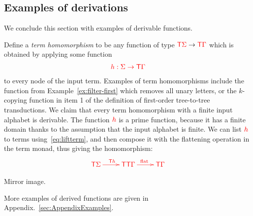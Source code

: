 

\subsection{Examples of derivations} 
\label{sec:example-derivations}
We conclude this section with  examples of derivable  functions. 
 
\noindent\begin{example}\label{ex:filter} 
   Define a \emph{term homomorphism}  to be any function of type ${\color{red}{\mathsf T}} {\color{red}{\Sigma}} \to {\color{red}{\mathsf T}} {\color{red}{\Gamma}}$ which is obtained by applying some function
   \begin{align*}
   {\color{red}{h : {\color{red}{\Sigma}}\to {\color{red}{\mathsf T}}{\color{red}{\Gamma}}}}
   \end{align*}
   to every node of the input term. Examples of term homomorphisms include the function from Example~\ref{ex:filter-first} which removes all unary letters, or the $k$-copying function in item 1 of the definition of first-order tree-to-tree transductions.  We claim that every term homomorphism with a finite input alphabet is derivable. The function ${\color{red}{h}}$ is a prime function, because it has a finite domain thanks to the assumption that the input alphabet is finite. We can list ${\color{red}{h}}$ to terms using~\eqref{eq:liftterm}, and then compose it with the flattening operation in the term monad, thus giving the homomorphism:
   \begin{align*}
   \ranked{\xymatrix{
\tmonad \rSigma \ar[r]^{\tmonad h} &
\tmonad \tmonad \rGamma \ar[r]^{\flatt} &
\tmonad \rGamma
   }}
   \end{align*} 
\end{example}

\begin{example}
    Mirror image.
\end{example}
More examples of derived functions are given in Appendix.~\ref{sec:AppendixExamples}.